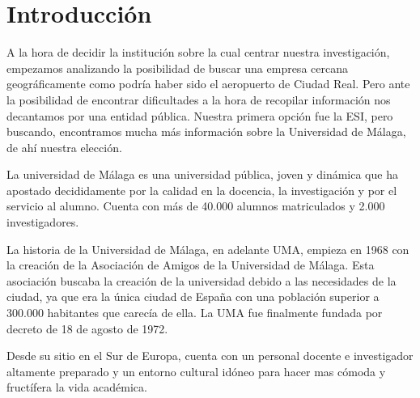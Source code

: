 \documentclass[11pt,a4paper,spanish,twoside]{report}
\begin{document}
\tableofcontents

\chapter*{Introducción}
A la hora de decidir la institución sobre la cual centrar nuestra 
investigación, empezamos analizando la posibilidad de buscar una empresa 
cercana geográficamente como podría haber sido el aeropuerto de Ciudad Real. 
Pero ante la posibilidad de encontrar dificultades a la hora de recopilar 
información nos decantamos por una entidad pública. Nuestra primera opción fue 
la ESI, pero buscando, encontramos mucha más información sobre la Universidad 
de Málaga, de ahí nuestra elección.

La universidad de Málaga es una universidad pública, joven y dinámica que ha 
apostado decididamente por la calidad en la docencia, la investigación y por el
servicio al alumno. Cuenta con más de 40.000 alumnos matriculados y 2.000 
investigadores. 

La historia de la Universidad de Málaga, en adelante UMA, empieza en 1968 con 
la creación de la Asociación de Amigos de la Universidad de Málaga. Esta 
asociación buscaba la creación de la universidad debido a las necesidades de la 
ciudad, ya que era la única ciudad de España con una población superior a 
300.000 habitantes que carecía de ella. La UMA fue finalmente 
fundada por decreto de 18 de agosto de 1972.

Desde su sitio en el Sur de Europa, cuenta con un personal docente e 
investigador altamente preparado y un entorno cultural idóneo para hacer mas 
cómoda y fructífera la vida académica.
\end{document}
